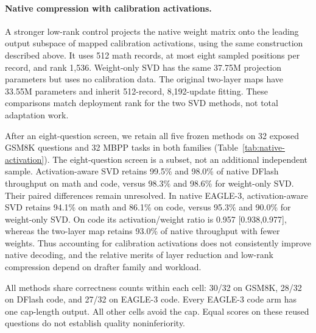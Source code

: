 \documentclass{article}
\begin{document}
\begin{table}[H]
\centering\small

\caption{Untrained cropping versus calibrated native EAGLE projections
on the same fixed 16-task subset. Every layer choice is retained.
Fitted/crop ratios are paired within worker, with 95\% question-bootstrap
intervals. This subset does not add 64 independent questions.}
\label{tab:native-eagle-code-crops}
\end{table}

\paragraph{Native compression with calibration activations.}
A stronger low-rank control projects the native weight matrix onto the
leading output subspace of mapped calibration activations, using the
same construction described above. It uses 512 math records, at most
eight sampled positions per record, and rank 1,536. Weight-only SVD has
the same 37.75M projection parameters but uses no calibration data.
The original two-layer maps have 33.55M parameters and inherit 512-record,
8,192-update fitting. These comparisons match deployment rank for the two
SVD methods, not total adaptation work.

After an eight-question screen, we retain all five frozen methods on
32 exposed GSM8K questions and 32 MBPP tasks in both families
(Table~\ref{tab:native-activation}). The eight-question screen is a subset,
not an additional independent sample. Activation-aware SVD retains
99.5\% and 98.0\% of native DFlash throughput on math and code, versus
98.3\% and 98.6\% for weight-only SVD. Their paired differences remain
unresolved. In native EAGLE-3, activation-aware SVD retains 94.1\% on
math and 86.1\% on code, versus 95.3\% and 90.0\% for weight-only SVD.
On code its activation/weight ratio is 0.957 [0.938,0.977], whereas the
two-layer map retains 93.0\% of native throughput with fewer weights.
Thus accounting for calibration activations does not consistently improve
native decoding, and the relative merits of layer reduction and low-rank
compression depend on drafter family and workload.

All methods share correctness counts within each cell: 30/32 on GSM8K,
28/32 on DFlash code, and 27/32 on EAGLE-3 code. Every EAGLE-3 code arm
has one cap-length output. All other cells avoid the cap. Equal scores
on these reused questions do not establish quality noninferiority.

\begin{table}[H]
\centering\footnotesize

\caption{Native-interface compression on 32 development questions per
workload and family. Intervals use 10,000 paired question bootstrap draws.
Both SVD methods use rank 1,536. The two-layer maps retain layers 25 and 33.
Caps are 2,048 tokens on GSM8K and 1,024 on MBPP. Every EAGLE-3 MBPP
arm reaches the cap once, with no cap hits elsewhere. Code scores use
published base-test suites. No multiplicity correction or new confirmation
sample is claimed.}
\label{tab:native-activation}
\end{table}
\end{document}
